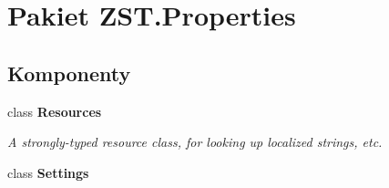 \hypertarget{namespace_z_s_t_1_1_properties}{}\section{Pakiet Z\+S\+T.\+Properties}
\label{namespace_z_s_t_1_1_properties}
\subsection*{Komponenty}
\begin{DoxyCompactItemize}
\item 
class {\bfseries Resources}
\begin{DoxyCompactList}\small\item\em A strongly-\/typed resource class, for looking up localized strings, etc. \end{DoxyCompactList}\item 
class {\bfseries Settings}
\end{DoxyCompactItemize}
